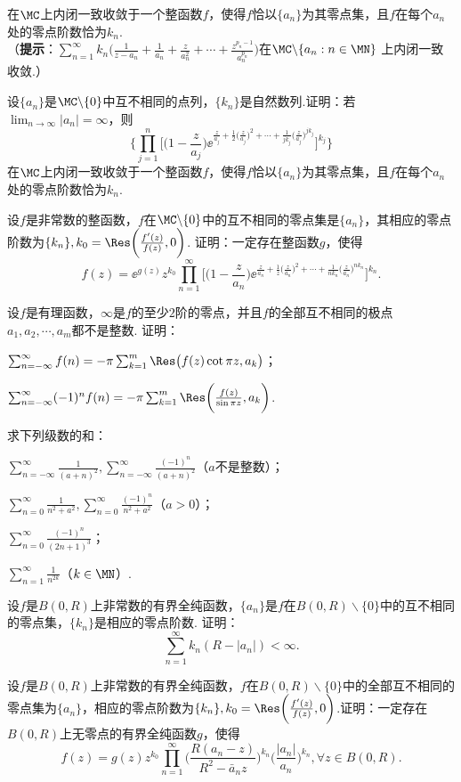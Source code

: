 \begin{xiti}
在$\MC$上内闭一致收敛于一个整函数$f$，使得$f$恰以$\{a_n\}$为其零点集，且$f$在每个$a_n$处的零点阶数恰为$k_n$.\\
（\textbf{提示}：$\sum_{n=1}^\infty k_n\bigg(\frac1{z-a_n}+\frac1{a_n}
+\frac z{a_n^2}+\cdots+\frac{z^{p_n-1}}{a_n^{p_n}}\bigg)$在$\MC\backslash\{a_n:n\in\MN\}$
上内闭一致收敛.）
\item 设$\{a_n\}$是$\MC\backslash\{0\}$中互不相同的点列，$\{k_n\}$是自然数列.证明：若$\lim_{n\to\infty}|a_n|=\infty$，则
\[\bigg\{\prod_{j=1}^n\bigg[\bigg(1-\frac z{a_j}\bigg)\ee^{\frac z{a_j}+\frac12\big(\frac z{a_j}\big)^2+\cdots+\frac1{jk_j}\big(\frac z{a_j}\big)^{jk_j}}\bigg]^{k_j}\bigg\}\]
在$\MC$上内闭一致收敛于一个整函数$f$，使得$f$恰以$\{a_n\}$为其零点集，且$f$在每个$a_n$处的零点阶数恰为$k_n$.
\item 设$f$是非常数的整函数，$f$在$\MC\backslash\{0\}$中的互不相同的零点集是$\{a_n\}$，其相应的零点阶数为$\{k_n\},k_0=\Res\bigg(\frac{f'(z)}{f(z)},0\bigg)$. 证明：一定存在整函数$g$，使得
    \[f(z)=\ee^{g(z)}z^{k_0}\prod_{n=1}^\infty\bigg[\bigg(1-\frac z{a_n}\bigg)\ee^{\frac z{a_n}+\frac1z\big(\frac z{a_n}\big)^2
    +\cdots+\frac1{nk_n}\big(\frac z{a_n}\big)^{nk_n}}\bigg]^{k_n}.\]
\item 设$f$是有理函数，$\infty$是$f$的至少$2$阶的零点，并且$f$的全部互不相同的极点$a_1,a_2,\cdots,a_m$都不是整数. 证明：
\begin{enuma}
  \item $\sum_{n=-\infty}^\infty f(n)=-\pi\sum_{k=1}^m\Res\big(f(z)\cot\pi z,a_k\big)$；
  \item $\sum_{n=-\infty}^\infty (-1)^nf(n)=-\pi\sum_{k=1}^m\Res\bigg(\frac{f(z)}{\sin\pi z},a_k\bigg)$.
\end{enuma}
\item 求下列级数的和：
\begin{enuma}
  \item $\sum_{n=-\infty}^\infty\frac1{(a+n)^2},\sum_{n=-\infty}^\infty
      \frac{(-1)^n}{(a+n)^2}$（$a$不是整数）；
  \item $\sum_{n=0}^\infty\frac1{n^2+a^2},\sum_{n=0}^\infty\frac{(-1)^n}{n^2+a^2}$（$a>0$）；
  \item $\sum_{n=0}^\infty\frac{(-1)^n}{(2n+1)^3}$；
  \item $\sum_{n=1}^\infty\frac1{n^{2k}}$（$k\in\MN$）.
\end{enuma}
\item 设$f$是$B(0,R)$上非常数的有界全纯函数，$\{a_n\}$是$f$在$B(0,R)\backslash\{0\}$中的互不相同的零点集，$\{k_n\}$是相应的零点阶数. 证明：
    \[\sum_{n=1}^\infty k_n(R-|a_n|)<\infty.\]
\item 设$f$是$B(0,R)$上非常数的有界全纯函数，$f$在$B(0,R)\backslash\{0\}$中的全部互不相同的零点集为$\{a_n\}$，相应的零点阶数为$\{k_n\},k_0=\Res\bigg(\frac{f'(z)}{f(z)},0\bigg)$.证明：一定存在$B(0,R)$上无零点的有界全纯函数$g$，使得
\[f(z)=g(z)z^{k_0}\prod_{n=1}^\infty\bigg(\frac{R(a_n-z)}{R^2-\bar a_nz}\bigg)^{k_n}
\bigg(\frac{|a_n|}{a_n}\bigg)^{k_n},\forall z\in B(0,R).\]
\end{xiti}
